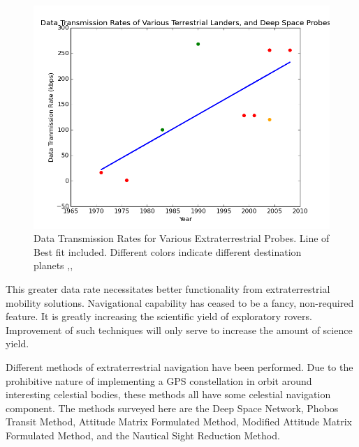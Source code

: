 \documentclass[12pt,a4paper]{book}
\begin{document}
\begin{figure}[h!]
\centering
\includegraphics[scale=0.60]{datarates.png}
\caption{Data Transmission Rates for Various Extraterrestrial Probes. Line of Best fit included.  Different colors indicate different destination planets \cite{b:mpl},\cite{b:messenger},\cite{b:mitchell}}
\label{f:datarates}
\end{figure}

This greater data rate necessitates better functionality from extraterrestrial mobility solutions.  Navigational capability has ceased to be a fancy, non-required feature.  It is greatly increasing the scientific yield of exploratory rovers.  Improvement of such techniques will only serve to increase the amount of science yield.  

Different methods of extraterrestrial navigation have been performed.  Due to the prohibitive nature of implementing a GPS constellation in orbit around interesting celestial bodies, these methods all have some celestial navigation component.  The methods surveyed here are the Deep Space Network, Phobos Transit Method, Attitude Matrix Formulated Method, Modified Attitude Matrix Formulated Method, and the Nautical Sight Reduction Method.
\end{document}
